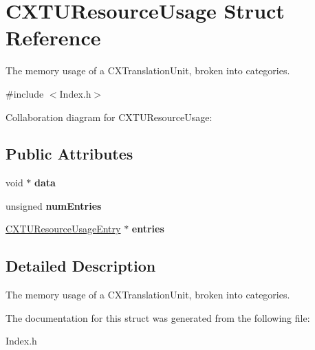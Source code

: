 \hypertarget{structCXTUResourceUsage}{}\section{C\+X\+T\+U\+Resource\+Usage Struct Reference}
\label{structCXTUResourceUsage}


The memory usage of a C\+X\+Translation\+Unit, broken into categories.  




{\ttfamily \#include $<$Index.\+h$>$}



Collaboration diagram for C\+X\+T\+U\+Resource\+Usage\+:
\subsection*{Public Attributes}
\begin{DoxyCompactItemize}
\item 
\mbox{\label{structCXTUResourceUsage_a56d46172a9121cdf6748f544ba4feb2a}} 
void $\ast$ {\bfseries data}
\item 
\mbox{\label{structCXTUResourceUsage_a0cc8e6220236ac79be31d7b91f0732d5}} 
unsigned {\bfseries num\+Entries}
\item 
\mbox{\label{structCXTUResourceUsage_a00d8889f2349ce44ed2087de98b525b2}} 
\hyperlink{structCXTUResourceUsageEntry}{C\+X\+T\+U\+Resource\+Usage\+Entry} $\ast$ {\bfseries entries}
\end{DoxyCompactItemize}


\subsection{Detailed Description}
The memory usage of a C\+X\+Translation\+Unit, broken into categories. 

The documentation for this struct was generated from the following file\+:\begin{DoxyCompactItemize}
\item 
Index.\+h\end{DoxyCompactItemize}
